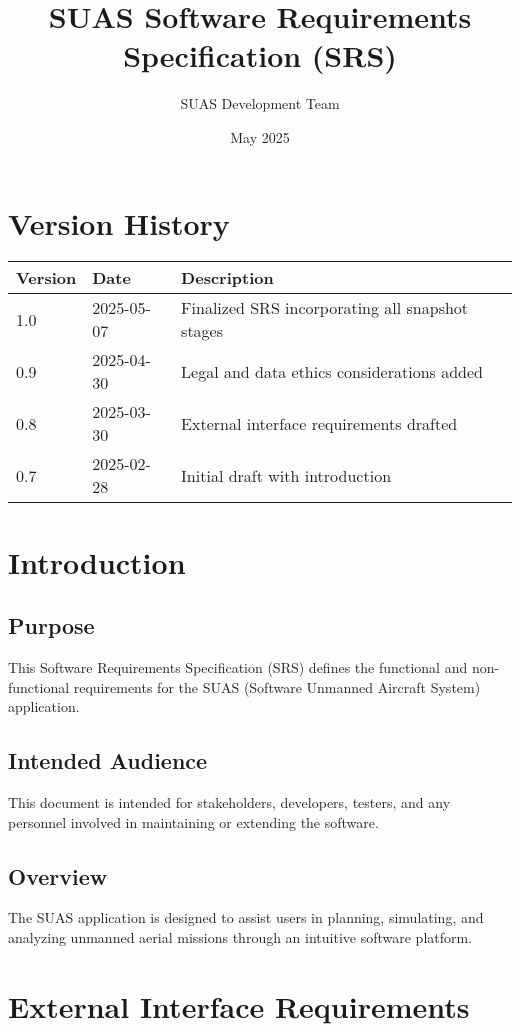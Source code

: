 \documentclass{article}
\title{SUAS Software Requirements Specification (SRS)}
\author{SUAS Development Team}
\date{May 2025}
\begin{document}
\maketitle
\newpage

\tableofcontents
\newpage

\section*{Version History}
\begin{longtable}{| m{3cm} | m{3cm} | m{8cm} |}
\hline
\textbf{Version} & \textbf{Date} & \textbf{Description} \\
\hline
1.0 & 2025-05-07 & Finalized SRS incorporating all snapshot stages \\
\hline
0.9 & 2025-04-30 & Legal and data ethics considerations added \\
\hline
0.8 & 2025-03-30 & External interface requirements drafted \\
\hline
0.7 & 2025-02-28 & Initial draft with introduction \\
\hline
\end{longtable}

\section{Introduction}
\subsection{Purpose}
This Software Requirements Specification (SRS) defines the functional and non-functional requirements for the SUAS (Software Unmanned Aircraft System) application.

\subsection{Intended Audience}
This document is intended for stakeholders, developers, testers, and any personnel involved in maintaining or extending the software.

\subsection{Overview}
The SUAS application is designed to assist users in planning, simulating, and analyzing unmanned aerial missions through an intuitive software platform.

\section{External Interface Requirements}
\end{document}
